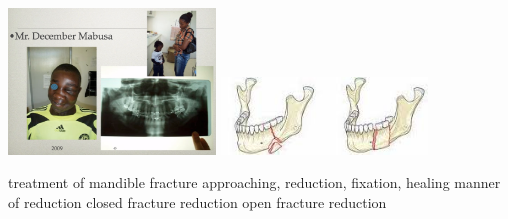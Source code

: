 \documentclass[
paper=landscape,
paper=160mm:90mm, %
fontsize=11pt, %
pagesize, %
parskip=half-, %
]{scrartcl} %
\newenvironment{WrapText1}[3][r]
{\wrapfigure[#2]{#1}{#3}}
{\endwrapfigure}
\newcommand{\wrapr}[6]{
\begin{minipage}{\linewidth}\mbox{}\\
\vspace{#1}
\begin{WrapText1}{#2}{#3}
\vspace{#4}#5\end{WrapText1}#6
\end{minipage}}
\theoremstyle{mythmstyle} %
\begin{document}
\clearpage


%

\wrapr{-8mm}{7}{6cm}{-1mm}
{%
\includegraphics[width=5.5cm]{Mabusa.png}
\includegraphics[width=5.5cm]{reduction_mandible.jpeg}
} %
{%
\begin{outline}
\1 treatment of mandible fracture
    \2 approaching, reduction, fixation, healing
\1  manner of reduction
    \2 closed fracture reduction
    \2 open fracture reduction
\end{outline}
} %

\clearpage

\end{document}
